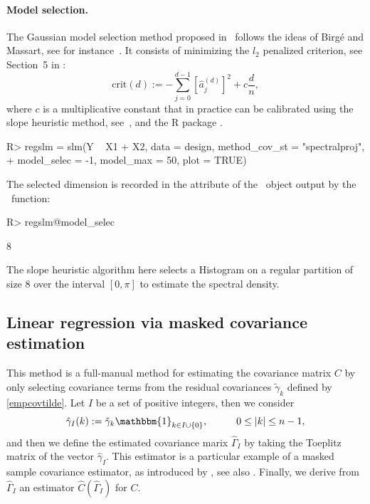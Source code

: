 \paragraph{Model selection.} The Gaussian model selection method proposed in~\cite{comte2001adaptive} follows the ideas of Birg\'e and Massart, see for instance~\cite{massart2007concentration}. It consists of minimizing the $l_2$ penalized criterion, see Section~5 in \cite{comte2001adaptive}:
$$ \mbox{crit}(d) :=  - \sum_{j=0} ^{d-1}  \left[ \hat{a}_{j}^{(d)} \right] ^2  + c \frac dn, $$
where $c$ is a multiplicative constant that in practice can be calibrated using the slope heuristic method, see~\cite{birge2007minimal}, \cite{baudry2012slope} and the R package .
\begin{Schunk}
\begin{Sinput}
R> regslm = slm(Y ~ X1 + X2, data = design, method_cov_st = "spectralproj", 
+  	model_selec = -1, model_max = 50, plot = TRUE)
\end{Sinput}
\end{Schunk}
The selected dimension is recorded in the  attribute of the \slmf~object output by the \slmf~function:
\begin{Schunk}
\begin{Sinput}
R> regslm@model_selec
\end{Sinput}
\begin{Soutput}
[1] 8
\end{Soutput}
\end{Schunk}
The slope heuristic algorithm here selects a Histogram on a regular partition of size $8$ over the interval $[0, \pi]$ to estimate the spectral density.

\subsection{Linear regression via masked covariance estimation}

This method is a full-manual method for estimating the covariance matrix $C$ by only selecting covariance terms from the residual covariances $\tilde{\gamma}_{k}$ defined by \eqref{empcovtilde}. Let $I$ be a set of positive integers, then we  consider
$$\hat \gamma_I(k) := \tilde{\gamma}_{k} \mathbbm{1}_{k \in I\cup \{0\} },  \hskip 1cm 0 \leq |k| \leq n-1, $$
and then we define the estimated covariance marix $\widehat{\Gamma}_{I}$ by taking the Toeplitz matrix of the vector $\hat \gamma_I$. This estimator is a particular example of a masked sample covariance estimator, as introduced by \cite{chen2012masked}, see also \cite{levina2012partial}. Finally, we derive from $\widehat \Gamma_I$ an estimator $\widehat C (\widehat \Gamma_I) $ for $C$.

